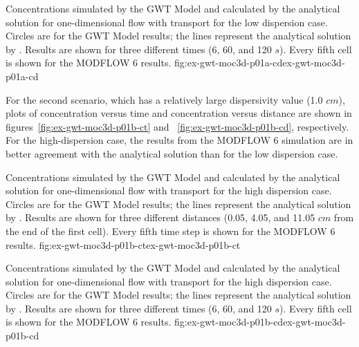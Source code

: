 \begin{StandardFigure}{
                                     Concentrations simulated by the \mf GWT Model and calculated by the analytical solution for one-dimensional flow with transport for the low dispersion case.  Circles are for the GWT Model results; the lines represent the analytical solution by \cite{wexler1992}.  Results are shown for three different times (6, 60, and 120 $s$).  Every fifth cell is shown for the MODFLOW 6 results.
                                     }{fig:ex-gwt-moc3d-p01a-cd}{ex-gwt-moc3d-p01a-cd}
\end{StandardFigure}            

For the second scenario, which has a relatively large dispersivity value (1.0 $cm$), plots of concentration versus time and concentration versus distance are shown in figures~\ref{fig:ex-gwt-moc3d-p01b-ct} and ~\ref{fig:ex-gwt-moc3d-p01b-cd}, respectively.  For the high-dispersion case, the results from the MODFLOW 6 simulation are in better agreement with the analytical solution than for the low dispersion case.

\begin{StandardFigure}{
                                     Concentrations simulated by the \mf GWT Model and calculated by the analytical solution for one-dimensional flow with transport for the high dispersion case.  Circles are for the GWT Model results; the lines represent the analytical solution by \cite{wexler1992}.  Results are shown for three different distances (0.05, 4.05, and 11.05 $cm$ from the end of the first cell).  Every fifth time step is shown for the MODFLOW 6 results.
                                     }{fig:ex-gwt-moc3d-p01b-ct}{ex-gwt-moc3d-p01b-ct}
\end{StandardFigure}            

\begin{StandardFigure}{
                                     Concentrations simulated by the \mf GWT Model and calculated by the analytical solution for one-dimensional flow with transport for the high dispersion case.  Circles are for the GWT Model results; the lines represent the analytical solution by \cite{wexler1992}.  Results are shown for three different times (6, 60, and 120 $s$).  Every fifth cell is shown for the MODFLOW 6 results.
                                     }{fig:ex-gwt-moc3d-p01b-cd}{ex-gwt-moc3d-p01b-cd}
\end{StandardFigure}            


